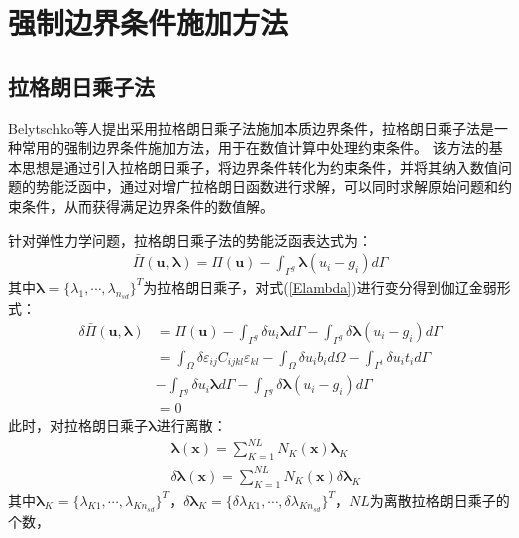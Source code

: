 \chapter{强制边界条件施加方法}
\section{拉格朗日乘子法}
Belytschko等人\cite{}提出采用拉格朗日乘子法施加本质边界条件，拉格朗日乘子法是一种常用的强制边界条件施加方法，用于在数值计算中处理约束条件。
该方法的基本思想是通过引入拉格朗日乘子，将边界条件转化为约束条件，并将其纳入数值问题的势能泛函中，通过对增广拉格朗日函数进行求解，可以同时求解原始问题和约束条件，从而获得满足边界条件的数值解。\par
针对弹性力学问题，拉格朗日乘子法的势能泛函表达式为：
\begin{equation}\label{Elambda}
\begin{split}
    \bar{\Pi}(\pmb{u},\pmb{\lambda})=\Pi(\pmb{u})-\int_{\Gamma^g}\pmb{\lambda}(u_i-g_i)d\Gamma
\end{split}
\end{equation}   
其中$\pmb{\lambda}=\{\lambda_1,\dotsb,\lambda_{n_{sd}}\}^T$为拉格朗日乘子，对式(\ref{Elambda})进行变分得到伽辽金弱形式：
\begin{equation}\label{Elambda weakform}
\begin{split}
        \delta\bar{\Pi}(\pmb{u},\pmb{\lambda})&=\Pi(\pmb{u})-\int_{\Gamma^g}\delta u_i\pmb{\lambda}d\Gamma-\int_{\Gamma^g}\delta\pmb{\lambda}(u_i-g_i)d\Gamma\\
       &=\int_{\Omega}\delta\varepsilon_{ij}C_{ijkl}\varepsilon_{kl}-\int_{\Omega}\delta u_ib_id\Omega-\int_{\Gamma^t}\delta u_it_id\Gamma\\
       &-\int_{\Gamma^g}\delta u_i\pmb{\lambda}d\Gamma-\int_{\Gamma^g}\delta\pmb{\lambda}(u_i-g_i)d\Gamma\\
       &=0
\end{split}
\end{equation} 
此时，对拉格朗日乘子$\pmb{\lambda}$进行离散：
\begin{equation}\label{lambdalisan}
\begin{split}
    &\pmb{\lambda}(\pmb{x})=\sum_{K=1}^{N\!L}N_K(\pmb{x})\pmb \lambda_K\\
&\delta\pmb{\lambda}(\pmb{x})=\sum_{K=1}^{N\!L}N_K(\pmb{x})\delta\pmb \lambda_K
\end{split}
\end{equation}
其中$\pmb \lambda_K=\{\lambda_{K1},\dotsb,\lambda_{Kn_{sd}}\}^T$，$\delta\pmb \lambda_K=\{\delta\lambda_{K1},\dotsb,\delta\lambda_{Kn_{sd}}\}^T$，$N\!L$为离散拉格朗日乘子的个数，
